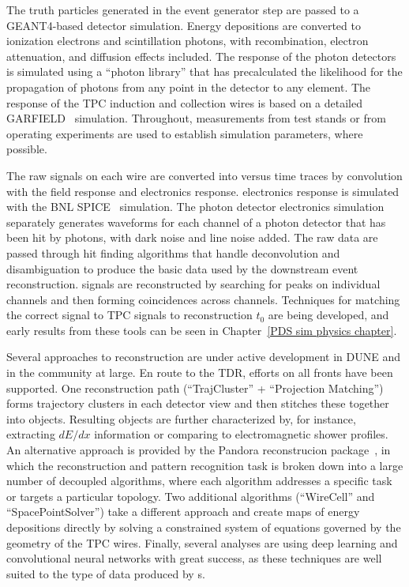 The truth particles generated in the event generator step are passed to a {\sc GEANT4}-based detector simulation.  Energy depositions are converted to ionization electrons and scintillation photons, with recombination, electron attenuation, and diffusion effects included.  The response of the photon detectors is simulated using a ``photon library'' that has precalculated the likelihood for the propagation of photons from any point in the detector to any  element.  The response of the TPC induction and collection wires is based on a detailed GARFIELD~\cite{garfield} simulation.  Throughout, measurements from test stands or from operating \lartpc experiments are used to establish simulation parameters, where possible.

The raw signals on each wire are converted into  versus time traces by convolution with the field response and electronics response.   electronics response is simulated with the BNL SPICE~\cite{spice} simulation.  The photon detector electronics simulation separately generates waveforms for each channel of a photon detector that has been hit by photons, with dark noise and line noise added.  The raw data are passed through hit finding algorithms that handle deconvolution and disambiguation to produce the basic data used by the downstream event reconstruction.  signals are reconstructed by searching for peaks on individual channels and then forming coincidences across channels. Techniques for matching the correct  signal to TPC signals to reconstruction $t_0$ are being developed, and early results from these tools can be seen in Chapter~\ref{PDS sim physics chapter}. 

Several approaches to \lartpc reconstruction are under active development in DUNE and in the community at large.  En route to the TDR, efforts on all fronts have been supported.  One  reconstruction path (``TrajCluster'' + ``Projection Matching'') forms \twod trajectory clusters in each detector view and then stitches these together into \threed objects.  Resulting objects are further characterized by, for instance, extracting $dE/dx$ information or comparing to electromagnetic shower profiles.  An alternative approach is provided by the Pandora reconstrucion package~\cite{Marshall:2015rfa}, in which the reconstruction and pattern recognition task is broken down into a large number of decoupled algorithms, where each algorithm addresses a specific task or targets a particular topology.  Two additional algorithms (``WireCell'' and ``SpacePointSolver'') take a different approach and create \threed maps of energy depositions directly by solving a constrained system of equations governed by the geometry of the TPC wires.  Finally, several analyses are using deep learning and convolutional neural networks with great success, as these techniques are well suited to the type of data produced by \lartpc{}s.

